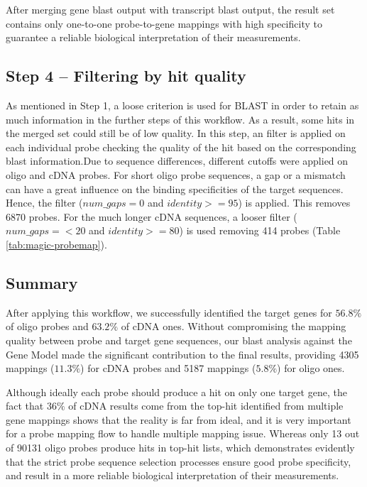 After merging gene blast output with transcript blast output, the result set contains only one-to-one probe-to-gene mappings with high specificity to guarantee a reliable biological interpretation of their measurements. 



\subsection{Step 4 – Filtering by hit quality}

As mentioned in Step 1, a loose criterion is used for BLAST in order to retain as much information in the further steps of this workflow. As a result, some hits in the merged set could still be of low quality. In this step, an filter is applied on each individual probe checking the quality of the hit based on the corresponding blast information.Due to sequence differences, different cutoffs were applied on oligo and cDNA probes. For short oligo probe sequences, a gap or a mismatch can have a great influence on the binding specificities of the target sequences. Hence, the filter ($num\_gaps = 0$ and $identity >= 95$) is applied. This removes 6870 probes. For the much longer cDNA sequences, a looser filter ($num\_gaps =< 20$ and $identity >= 80$) is used removing 414 probes (Table \ref{tab:magic-probemap}). 


\subsection*{Summary}

After applying this workflow, we successfully identified the target genes for $56.8\%$ of oligo probes and $63.2\%$ of cDNA ones. Without compromising the mapping quality between probe and target gene sequences, our blast analysis against the Gene Model made the significant contribution to the final results, providing 4305 mappings ($11.3\%$) for cDNA probes and 5187 mappings ($5.8\%$) for oligo ones.

Although ideally each probe should produce a hit on only one target gene, the fact that $36\%$ of cDNA results come from the top-hit identified from multiple gene mappings shows that the reality is far from ideal, and it is very important for a probe mapping flow to handle multiple mapping issue. Whereas only 13 out of 90131 oligo probes produce hits in top-hit lists, which demonstrates evidently that the strict probe sequence selection processes ensure good probe specificity, and result in a more reliable biological interpretation of their measurements.










